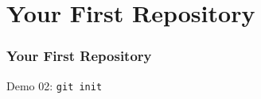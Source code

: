 \section[Section]{Your First Repository}

\begin{frame}
\frametitle{Your First Repository}
\alert{Demo 02}: \texttt{git init}
\end{frame}
